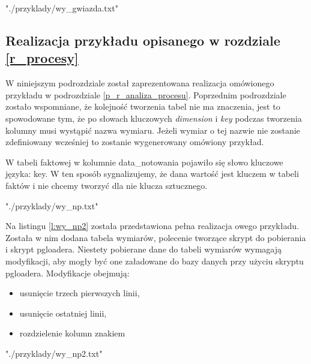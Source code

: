  {"./przyklady/wy_gwiazda.txt"}
\subsection{Realizacja przykładu opisanego w rozdziale \ref{r_procesy}  }

W niniejszym podrozdziale został zaprezentowana realizacja omówionego przykładu w podrozdziale \ref{p_r_analiza_procesu}.
Poprzednim podrozdziale zostało wspomniane, że kolejność tworzenia tabel nie ma znaczenia,
 jest to spowodowane tym, że po słowach kluczowych  \textit{dimension} i  \textit{key} 
 podczas tworzenia kolumny musi wystąpić nazwa wymiaru. 
Jeżeli wymiar o tej nazwie nie zostanie zdefiniowany wcześniej to zostanie wygenerowany omówiony przykład.

W tabeli faktowej w kolumnie data\_notowania pojawiło się słowo kluczowe języka: key.
W ten sposób sygnalizujemy,
 że dana wartość jest kluczem w tabeli faktów
 i nie chcemy tworzyć dla nie klucza sztucznego. 

 {"./przyklady/wy_np.txt"}


Na listingu \ref{l:wy_np2} została przedstawiona pełna realizacja owego przykładu.
Została w nim dodana tabela wymiarów,
 polecenie tworzące skrypt do pobierania
 i skrypt pgloadera.
Niestety pobierane dane do tabeli wymiarów wymagają modyfikacji,
 aby mogły być one załadowane do bazy danych przy użyciu skryptu pgloadera.
 Modyfikacje obejmują: 
\begin{itemize}
 \item usunięcie trzech pierwszych linii,
 \item usunięcie ostatniej linii,
 \item rozdzielenie kolumn znakiem 
\end{itemize}


 {"./przyklady/wy_np2.txt"}
